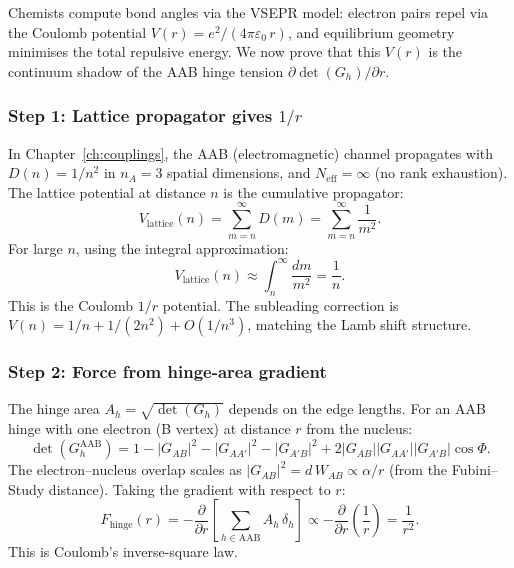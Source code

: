 Chemists compute bond angles via the VSEPR model: electron pairs repel via the Coulomb potential $V(r) = e^2/(4\pi\varepsilon_0\,r)$, and equilibrium geometry minimises the total repulsive energy.  We now prove that this $V(r)$ is the continuum shadow of the AAB hinge tension $\partial\det(G_h)/\partial r$.

\subsubsection{Step 1: Lattice propagator gives $1/r$}

In Chapter~\ref{ch:couplings}, the AAB (electromagnetic) channel propagates with $D(n) = 1/n^2$ in $n_A = 3$ spatial dimensions, and $N_\text{eff} = \infty$ (no rank exhaustion).  The lattice potential at distance $n$ is the cumulative propagator:
\begin{equation}
V_\text{lattice}(n) = \sum_{m=n}^{\infty} D(m) = \sum_{m=n}^{\infty}\frac{1}{m^2}.
\end{equation}
For large $n$, using the integral approximation:
\begin{equation}
V_\text{lattice}(n) \approx \int_n^\infty \frac{dm}{m^2} = \frac{1}{n}.
\end{equation}
This is the Coulomb $1/r$ potential.  The subleading correction is $V(n) = 1/n + 1/(2n^2) + O(1/n^3)$, matching the Lamb shift structure.

\subsubsection{Step 2: Force from hinge-area gradient}

The hinge area $A_h = \sqrt{\det(G_h)}$ depends on the edge lengths.  For an AAB hinge with one electron (B vertex) at distance $r$ from the nucleus:
\begin{equation}
\det(G_h^{\text{AAB}}) = 1 - |G_{AB}|^2 - |G_{AA'}|^2 - |G_{A'B}|^2 + 2|G_{AB}||G_{AA'}||G_{A'B}|\cos\Phi.
\end{equation}
The electron--nucleus overlap scales as $|G_{AB}|^2 = d\,W_{AB} \propto \alpha/r$ (from the Fubini--Study distance).  Taking the gradient with respect to $r$:
\begin{equation}
F_\text{hinge}(r) = -\frac{\partial}{\partial r}\left[\sum_{h \in \text{AAB}} A_h\,\delta_h\right] \propto -\frac{\partial}{\partial r}\left(\frac{1}{r}\right) = \frac{1}{r^2}.
\end{equation}
This is Coulomb's inverse-square law.

